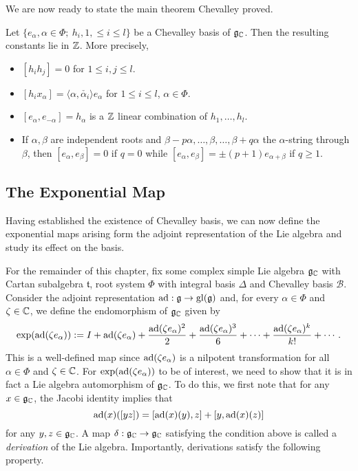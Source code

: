 We are now ready to state the main theorem Chevalley proved.

\begin{theorem}[Chevalley, 1995]\label{thm:chevalleybasis}
    Let $\{e_\alpha,\alpha\in\Phi;\ h_i,1,\leq i\leq l\}$ be a Chevalley basis of $\mathfrak{g}_{\mathbb{C}}$. Then the resulting constants lie in $\mathbb{Z}$. More precisely,
    \begin{itemize}
        \item $[h_ih_j]=0$ for $1\leq i,j\leq l$.
        \item $[h_ix_\alpha]=\langle\alpha,\check{\alpha_i}\rangle e_\alpha$ for $1\leq i\leq l$, $\alpha\in\Phi$.
        \item $[e_\alpha,e_{-\alpha}]=h_\alpha$ is a $\mathbb{Z}$ linear combination of $h_1,\ldots,h_l$.
        \item If $\alpha,\beta$ are independent roots and $\beta-p\alpha,\ldots,\beta,\ldots,\beta+q\alpha$ the $\alpha$-string through $\beta$, then $[e_\alpha,e_\beta]=0$ if $q=0$ while $[e_\alpha,e_\beta]=\pm(p+1)e_{\alpha+\beta}$ if $q\geq 1$.
    \end{itemize} 
\end{theorem}





\subsection{The Exponential Map}
Having established the existence of Chevalley basis, we can now define the exponential maps arising form the adjoint representation of the Lie algebra and study its effect on the basis. 

For the remainder of this chapter, fix some complex simple Lie algebra $\mathfrak{g}_{\mathbb{C}}$ with Cartan subalgebra $\mathfrak{t}$, root system $\Phi$ with integral basis $\Delta$ and Chevalley basis $\mathcal{B}$. Consider the adjoint representation $\mathrm{ad}:\mathfrak{g}\to\mathrm{gl}(\mathfrak{g})$ and, for every $\alpha\in\Phi$ and $\zeta\in\mathbb{C}$, we define the endomorphism of $\mathfrak{g}_{\mathbb{C}}$ given by
$$\exp(\mathrm{ad}(\zeta e_\alpha)):=I+\mathrm{ad}(\zeta e_\alpha)+\frac{\mathrm{ad}(\zeta e_\alpha)^2}{2}+\frac{\mathrm{ad}(\zeta e_\alpha)^3}{6}+\cdots+\frac{\mathrm{ad}(\zeta e_\alpha)^k}{k!}+\cdots.$$
This is a well-defined map since $\mathrm{ad}(\zeta e_\alpha)$ is a nilpotent transformation for all $\alpha\in\Phi$ and $\zeta\in\mathbb{C}$. For $\exp(\mathrm{ad}(\zeta e_\alpha))$ to be of interest, we need to show that it is in fact a Lie algebra automorphism of $\mathfrak{g}_{\mathbb{C}}$. To do this, we first note that for any $x\in\mathfrak{g}_{\mathbb{C}}$, the Jacobi identity implies that
$$\mathrm{ad}(x)([yz])=[\mathrm{ad}(x)(y),z]+[y,\mathrm{ad}(x)(z)]$$
for any $y,z\in\mathfrak{g}_{\mathbb{C}}$. A map $\delta:\mathfrak{g}_{\mathbb{C}}\to\mathfrak{g}_{\mathbb{C}}$ satisfying the condition above is called a \textit{derivation} of the Lie algebra. Importantly, derivations satisfy the following property.

